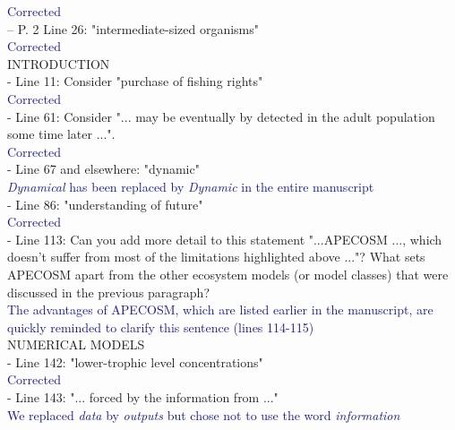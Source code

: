 \documentclass[12pt]{article}
\newcommand{\resp}[1]{\textcolor{MidnightBlue}{#1}}
\begin{document}
\resp{Corrected}\\

-- P. 2 Line 26: "intermediate-sized organisms"\\

\resp{Corrected}\\

INTRODUCTION\\

- Line 11: Consider "purchase of fishing rights"\\

\resp{Corrected}\\

- Line 61: Consider "... may be eventually by detected in the adult population some time later ...".\\

\resp{Corrected}   \\

- Line 67 and elsewhere: "dynamic"\\

\resp{\emph{Dynamical} has been replaced by \emph{Dynamic} in the entire manuscript} \\

- Line 86: "understanding of future" \\

\resp{Corrected} \\

- Line 113: Can you add more detail to this statement "...APECOSM ..., which doesn't suffer from most of the limitations highlighted above ..."? What sets APECOSM apart from the other ecosystem models (or model classes) that were discussed in the previous paragraph?\\

\resp{The advantages of APECOSM, which are listed earlier in the manuscript, are quickly reminded to clarify this sentence (lines 114-115)}\\

NUMERICAL MODELS\\

- Line 142: "lower-trophic level concentrations"\\

\resp{Corrected}\\

- Line 143: "... forced by the information from ..."\\

\resp{We replaced \emph{data} by \emph{outputs} but chose not to use the word \emph{information}}\\
\end{document}
